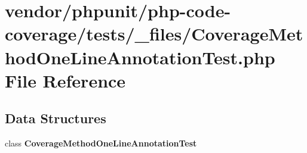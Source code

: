 \section{vendor/phpunit/php-\/code-\/coverage/tests/\+\_\+files/\+Coverage\+Method\+One\+Line\+Annotation\+Test.php File Reference}
\label{php-code-coverage_2tests_2__files_2_coverage_method_one_line_annotation_test_8php}
\subsection*{Data Structures}
\begin{DoxyCompactItemize}
\item 
class {\bf Coverage\+Method\+One\+Line\+Annotation\+Test}
\end{DoxyCompactItemize}
